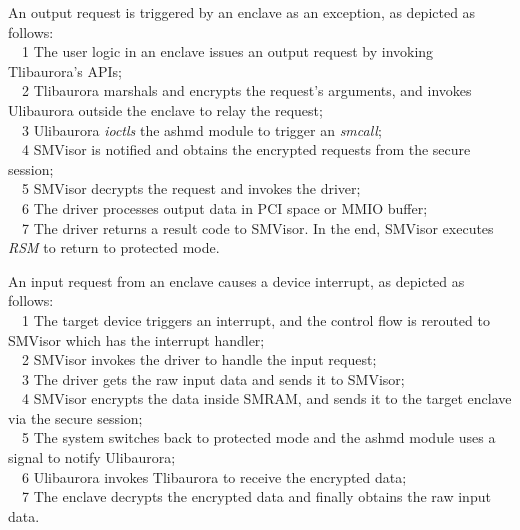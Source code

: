 An output request is triggered by an enclave as an exception, as depicted as follows:\\
~~\textcircled{\footnotesize{1}} The user logic in an enclave issues an output request by invoking  Tlibaurora's APIs;\\
~~\textcircled{\footnotesize{2}} Tlibaurora marshals and encrypts the request's arguments, and invokes Ulibaurora outside the enclave to relay the request;\\ %
~~\textcircled{\footnotesize{3}} Ulibaurora \emph{ioctls} the ashmd module to trigger an \textit{smcall};\\
~~\textcircled{\footnotesize{4}} SMVisor is notified and obtains the encrypted requests from the secure session;\\
~~\textcircled{\footnotesize{5}} SMVisor decrypts the request and invokes the driver;\\
~~\textcircled{\footnotesize{6}} The driver processes output data in PCI space or MMIO buffer;\\
~~\textcircled{\footnotesize{7}} The driver returns a result code to SMVisor. In the end, SMVisor executes \textit{RSM} to return to protected mode. \\

\par
An input request from an enclave causes a device interrupt, as depicted as follows:\\
~~\textcircled{\footnotesize{1}} The target device triggers an interrupt, and the control flow is rerouted to SMVisor which has the interrupt handler;\\
~~\textcircled{\footnotesize{2}} SMVisor invokes the driver to handle the input request;\\
~~\textcircled{\footnotesize{3}} The driver gets the raw input data and sends it to SMVisor;\\
~~\textcircled{\footnotesize{4}} SMVisor encrypts the data inside SMRAM, and sends it to the target enclave via the secure session;\\
~~\textcircled{\footnotesize{5}} The system switches back to protected mode and the ashmd module uses a signal to notify Ulibaurora;\\
~~\textcircled{\footnotesize{6}} Ulibaurora invokes Tlibaurora to receive the encrypted data;\\
~~\textcircled{\footnotesize{7}} The enclave decrypts the encrypted data and finally obtains the raw input data. %

